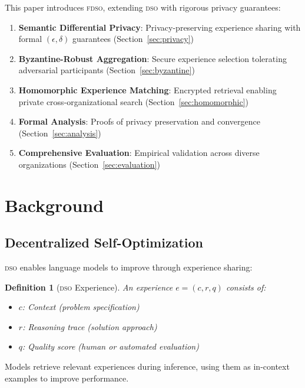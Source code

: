 \documentclass[11pt,letterpaper]{article}
\newtheorem{definition}{Definition}[section]
\newcommand{\DSO}{\textsc{dso}}
\newcommand{\FDSO}{\textsc{fdso}}
\begin{document}
This paper introduces \FDSO{}, extending \DSO{} with rigorous privacy guarantees:

\begin{enumerate}
    \item \textbf{Semantic Differential Privacy}: Privacy-preserving experience sharing with formal $(\epsilon, \delta)$ guarantees (Section~\ref{sec:privacy})

    \item \textbf{Byzantine-Robust Aggregation}: Secure experience selection tolerating adversarial participants (Section~\ref{sec:byzantine})

    \item \textbf{Homomorphic Experience Matching}: Encrypted retrieval enabling private cross-organizational search (Section~\ref{sec:homomorphic})

    \item \textbf{Formal Analysis}: Proofs of privacy preservation and convergence (Section~\ref{sec:analysis})

    \item \textbf{Comprehensive Evaluation}: Empirical validation across diverse organizations (Section~\ref{sec:evaluation})
\end{enumerate}

\section{Background}

\subsection{Decentralized Self-Optimization}

\DSO{} enables language models to improve through experience sharing:

\begin{definition}[\DSO{} Experience]
An experience $e = (c, r, q)$ consists of:
\begin{itemize}
    \item $c$: Context (problem specification)
    \item $r$: Reasoning trace (solution approach)
    \item $q$: Quality score (human or automated evaluation)
\end{itemize}
\end{definition}

Models retrieve relevant experiences during inference, using them as in-context examples to improve performance.
\end{document}
